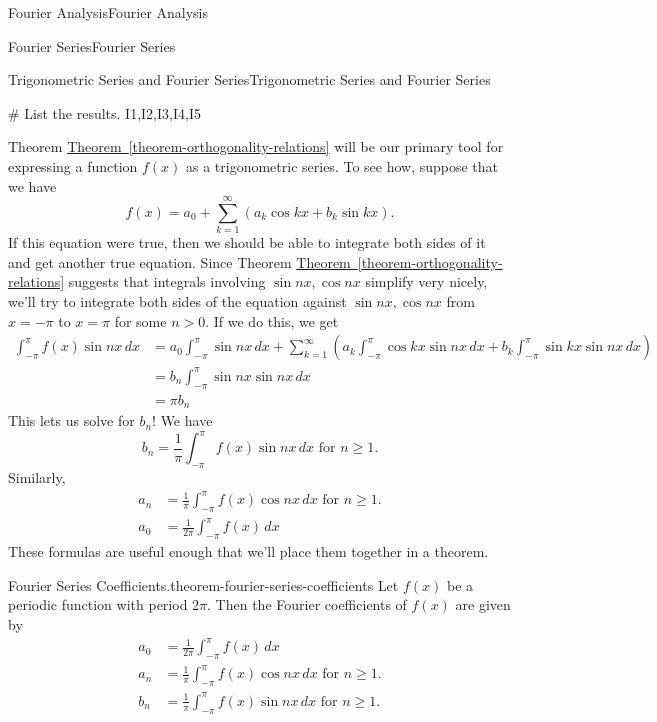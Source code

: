 \documentclass[10pt,]{book}
\numberwithin{equation}{section}
\begin{document}
\begin{chapterptx}{Fourier Analysis}{}{Fourier Analysis}{}{}
\begin{sectionptx}{Fourier Series}{}{Fourier Series}{}{}
\begin{subsectionptx}{Trigonometric Series and Fourier Series}{}{Trigonometric Series and Fourier Series}{}{}
\begin{sageinput}
# List the results.
I1,I2,I3,I4,I5
\end{sageinput}
\hypertarget{p-387}{}%
Theorem \hyperref[theorem-orthogonality-relations]{Theorem~\ref{theorem-orthogonality-relations}} will be our primary tool for expressing a function \(f(x)\) as a trigonometric series. To see how, suppose that we have%
\begin{equation*}
f(x) = a_{0} + \sum_{k=1}^{\infty}(a_{k}\cos kx+b_{k}\sin kx).
\end{equation*}
If this equation were true, then we should be able to integrate both sides of it and get another true equation. Since Theorem \hyperref[theorem-orthogonality-relations]{Theorem~\ref{theorem-orthogonality-relations}} suggests that integrals involving \(\sin nx,\cos nx\) simplify very nicely, we'll try to integrate both sides of the equation against \(\sin nx,\cos nx\) from \(x=-\pi\) to \(x=\pi\) for some \(n>0\). If we do this, we get%
\begin{align*}
\int_{-\pi}^{\pi}f(x)\sin nx\,dx & = a_{0}\int_{-\pi}^{\pi}\sin nx\,dx + \sum_{k=1}^{\infty}\left(a_{k}\int_{-\pi}^{\pi}\cos kx\sin nx\,dx + b_{k}\int_{-\pi}^{\pi}\sin kx\sin nx\,dx\right)\\
& = b_{n}\int_{-\pi}^{\pi}\sin nx \sin nx \,dx\\
& = \pi b_{n}
\end{align*}
This lets us solve for \(b_{n}\)! We have%
\begin{equation*}
b_{n} = \frac{1}{\pi}\int_{-\pi}^{\pi}f(x)\sin nx\,dx\text{ for $n\geq 1$.}
\end{equation*}
Similarly,%
\begin{align*}
a_{n} & = \frac{1}{\pi}\int_{-\pi}^{\pi}f(x)\cos nx\,dx\text{ for $n\geq1$.}\\
a_{0} & = \frac{1}{2\pi}\int_{-\pi}^{\pi}f(x)\,dx
\end{align*}
These formulas are useful enough that we'll place them together in a theorem.%
\begin{theorem}{Fourier Series Coefficients.}{}{theorem-fourier-series-coefficients}%
\hypertarget{p-388}{}%
Let \(f(x)\) be a periodic function with period \(2\pi\). Then the Fourier coefficients of \(f(x)\) are given by%
\begin{align*}
a_{0} &= \frac{1}{2\pi}\int_{-\pi}^{\pi}f(x)\,dx\\
a_{n} & = \frac{1}{\pi}\int_{-\pi}^{\pi}f(x)\cos nx\,dx\text{ for $n\geq1$.}\\
b_{n} &= \frac{1}{\pi}\int_{-\pi}^{\pi}f(x)\sin nx\,dx\text{ for $n\geq 1$.}

\end{align*}
\end{theorem}
\end{subsectionptx}
\end{sectionptx}
\end{chapterptx}
\end{document}
